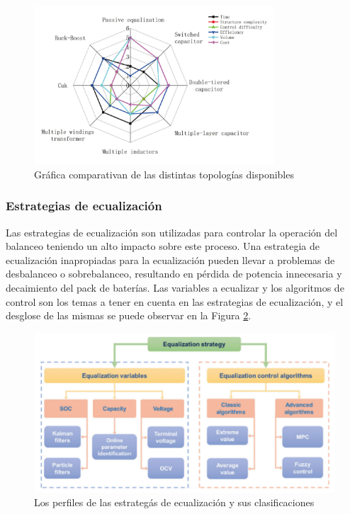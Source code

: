 \documentclass[10pt,a4paper]{article}
\begin{document}
\begin{figure}[h!]
    \begin{center}
        \includegraphics[width=0.8\textwidth]{comp_eq_chart.png}
        \caption{Gr\'afica comparativan de las distintas topolog\'ias disponibles}
        \label{comp_bal_results}
    \end{center}
\end{figure}
\newpage
\subsubsection{Estrategias de ecualizaci\'on}

Las estrategias de ecualizaci\'on son utilizadas para controlar la operaci\'on
del balanceo teniendo un alto impacto sobre este proceso. Una estrategia de 
ecualizaci\'on inapropiadas para la ecualizaci\'on pueden llevar a problemas de 
desbalanceo o sobrebalanceo, resultando en p\'erdida de potencia innecesaria y 
decaimiento del pack de bater\'ias. Las variables a ecualizar y los algoritmos 
de control son los temas a tener en cuenta en las estrategias de ecualizaci\'on, 
y el desglose de las mismas se puede observar en la Figura 
\ref{eq_strategy_class}.

\begin{figure}[h!]
    \begin{center}
        \includegraphics[width=.8\textwidth]{eq_strategy_class.png}
        \caption{Los perfiles de las estrateg\'as de ecualizaci\'on y sus
                 clasificaciones}
        \label{eq_strategy_class}
    \end{center}
\end{figure}
\end{document}
